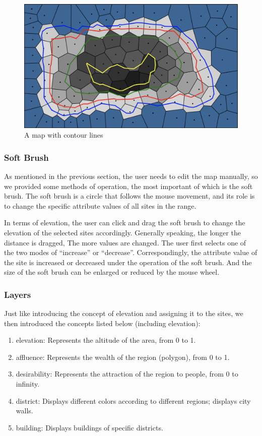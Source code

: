 \begin{figure}[htbp]
\centering
\includegraphics[width=\textwidth]{section04/assets/Map-contourline.png}
\caption[A map with contour lines]{\label{fig:contour line}A map with contour lines}
\end{figure}

\subsubsection{Soft Brush}
As mentioned in the previous section, the user needs to edit the map manually, so we provided some methods of operation, the most important of which is the soft brush. The soft brush is a circle that follows the mouse movement, and its role is to change the specific attribute values of all sites in the range.

In terms of elevation, the user can click and drag the soft brush to change the elevation of the selected sites accordingly. Generally speaking, the longer the distance is dragged, The more values are changed. The user first selects one of the two modes of ``increase'' or ``decrease''. Correspondingly, the attribute value of the site is increased or decreased under the operation of the soft brush. And the size of the soft brush can be enlarged or reduced by the mouse wheel.

\subsubsection{Layers}
Just like introducing the concept of elevation and assigning it to the sites, we then introduced the concepts listed below (including elevation):

\begin{enumerate}
  \item elevation: Represents the altitude of the area, from 0 to 1.
  \item affluence: Represents the wealth of the region (polygon), from 0 to 1.
  \item desirability: Represents the attraction of the region to people, from 0 to infinity.
  \item district: Displays different colors according to different regions; displays city walls.
  \item building: Displays buildings of specific districts.
\end{enumerate}

